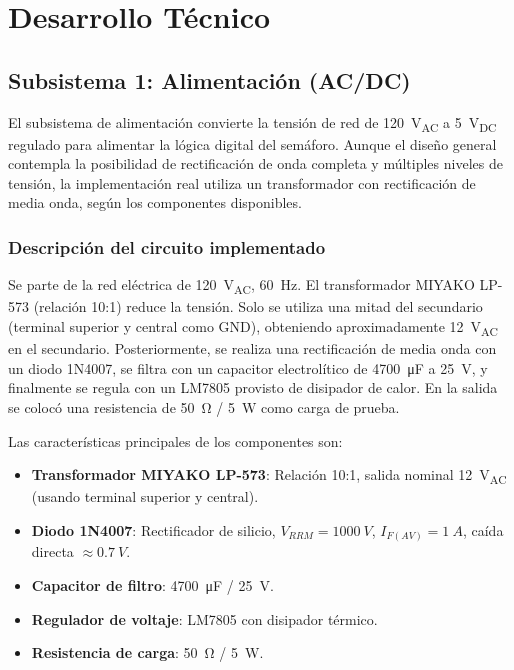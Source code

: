 \documentclass[10pt,onecolumn]{IEEEtran}
\begin{document}

\section{Desarrollo Técnico}

\subsection{Subsistema 1: Alimentación (AC/DC)}
\label{subsec:fuente}

El subsistema de alimentación convierte la tensión de red de \SI{120}{\volt_{AC}} a \SI{5}{\volt_{DC}} regulado para alimentar la lógica digital del semáforo. Aunque el diseño general contempla la posibilidad de rectificación de onda completa y múltiples niveles de tensión, la implementación real utiliza un transformador con rectificación de media onda, según los componentes disponibles.
\\
\subsubsection{Descripción del circuito implementado}

Se parte de la red eléctrica de \SI{120}{\volt_{AC}}, \SI{60}{\hertz}. El transformador MIYAKO LP-573 (relación 10:1) reduce la tensión. Solo se utiliza una mitad del secundario (terminal superior y central como GND), obteniendo aproximadamente \SI{12}{\volt_{AC}} en el secundario. Posteriormente, se realiza una rectificación de media onda con un diodo 1N4007, se filtra con un capacitor electrolítico de \SI{4700}{\micro\farad} a \SI{25}{\volt}, y finalmente se regula con un LM7805 provisto de disipador de calor. En la salida se colocó una resistencia de \SI{50}{\ohm} / \SI{5}{\watt} como carga de prueba.

Las características principales de los componentes son:
\begin{itemize}
    \item \textbf{Transformador MIYAKO LP-573}: Relación 10:1, salida nominal \SI{12}{V_{AC}} (usando terminal superior y central).
    \item \textbf{Diodo 1N4007}: Rectificador de silicio, $V_{RRM}=\SI{1000}{V}$, $I_{F(AV)}=\SI{1}{A}$, caída directa $\approx \SI{0.7}{V}$.
    \item \textbf{Capacitor de filtro}: \SI{4700}{\micro\farad} / \SI{25}{V}.
    \item \textbf{Regulador de voltaje}: LM7805 con disipador térmico.
    \item \textbf{Resistencia de carga}: \SI{50}{\ohm} / \SI{5}{W}.
\end{itemize}
\end{document}
